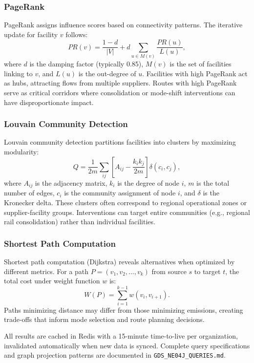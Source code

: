 \documentclass[conference]{IEEEtran}
\begin{document}
\subsubsection{PageRank}
PageRank assigns influence scores based on connectivity patterns. The iterative update for facility $v$ follows:
\begin{equation}
PR(v) = \frac{1-d}{|V|} + d \sum_{u \in M(v)} \frac{PR(u)}{L(u)},
\end{equation}
where $d$ is the damping factor (typically 0.85), $M(v)$ is the set of facilities linking to $v$, and $L(u)$ is the out-degree of $u$. Facilities with high PageRank act as hubs, attracting flows from multiple suppliers. Routes with high PageRank serve as critical corridors where consolidation or mode-shift interventions can have disproportionate impact.

\subsubsection{Louvain Community Detection}
Louvain community detection partitions facilities into clusters by maximizing modularity:
\begin{equation}
Q = \frac{1}{2m} \sum_{ij} \left[A_{ij} - \frac{k_i k_j}{2m}\right] \delta(c_i, c_j),
\end{equation}
where $A_{ij}$ is the adjacency matrix, $k_i$ is the degree of node $i$, $m$ is the total number of edges, $c_i$ is the community assignment of node $i$, and $\delta$ is the Kronecker delta. These clusters often correspond to regional operational zones or supplier-facility groups. Interventions can target entire communities (e.g., regional rail consolidation) rather than individual facilities.

\subsubsection{Shortest Path Computation}
Shortest path computation (Dijkstra) reveals alternatives when optimized by different metrics. For a path $P = (v_1, v_2, \ldots, v_k)$ from source $s$ to target $t$, the total cost under weight function $w$ is:
\begin{equation}
W(P) = \sum_{i=1}^{k-1} w(v_i, v_{i+1}).
\end{equation}
Paths minimizing distance may differ from those minimizing emissions, creating trade-offs that inform mode selection and route planning decisions.

All results are cached in Redis with a 15-minute time-to-live per organization, invalidated automatically when new data is synced. Complete query specifications and graph projection patterns are documented in \texttt{GDS\_NE04J\_QUERIES.md}.
\end{document}
